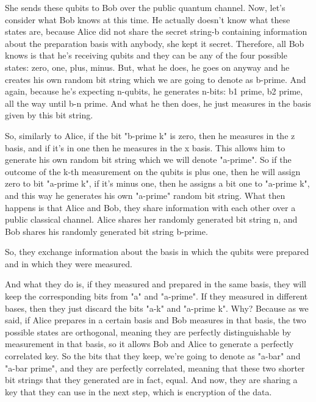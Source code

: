 She sends these qubits to Bob over the public quantum channel. Now, let's consider what Bob knows at this time. He actually doesn't know what these states are, because Alice did not share the secret string-b containing information about the preparation basis with anybody, she kept it secret. Therefore, all Bob knows is that he's receiving qubits and they can be any of the four possible states: zero, one, plus, minus. But, what he does, he goes on anyway and he creates his own random bit string which we are going to denote as b-prime. And again, because he's expecting n-qubits, he generates n-bits: b1 prime, b2 prime, all the way until b-n prime. And what he then does, he just measures in the basis given by this bit string.

So, similarly to Alice, if the bit "b-prime k" is zero, then he measures in the z basis, and if it's in one then he measures in the x basis. This allows him to generate his own random bit string which we will denote "a-prime". So if the outcome of the k-th measurement on the qubits is plus one, then he will assign zero to bit "a-prime k", if it's minus one, then he assigns a bit one to "a-prime k", and this way he generates his own "a-prime" random bit string. What then happens is that Alice and Bob, they share information with each other over a public classical channel. Alice shares her randomly generated bit string n, and Bob shares his randomly generated bit string b-prime.

So, they exchange information about the basis in which the qubits were prepared and in which they were measured.

And what they do is, if they measured and prepared in the same basis, they will keep the corresponding bits from "a" and "a-prime". If they measured in different bases, then they just discard the bits "a-k" and "a-prime k". Why? Because as we said, if Alice prepares in a certain basis and Bob measures in that basis, the two possible states are orthogonal, meaning they are perfectly distinguishable by measurement in that basis, so it allows Bob and Alice to generate a perfectly correlated key. So the bits that they keep, we're going to denote as "a-bar" and "a-bar prime", and they are perfectly correlated, meaning that these two shorter bit strings that they generated are in fact, equal. And now, they are sharing a key that they can use in the next step, which is encryption of the data.

